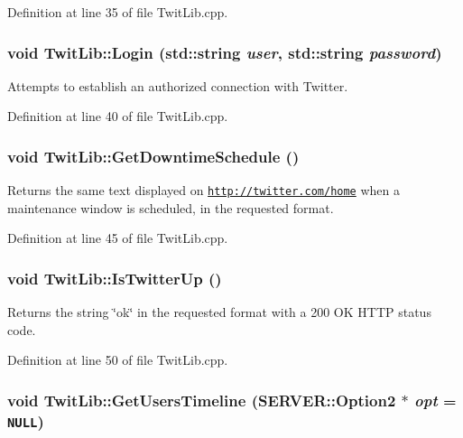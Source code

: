Definition at line 35 of file TwitLib.cpp.\hypertarget{classTwitLib_f0260115262ab0078071a4af3407b635}{
\subsubsection{\setlength{\rightskip}{0pt plus 5cm}void TwitLib::Login (std::string {\em user}, \/  std::string {\em password})}}
\label{classTwitLib_f0260115262ab0078071a4af3407b635}


Attempts to establish an authorized connection with Twitter. 

Definition at line 40 of file TwitLib.cpp.\hypertarget{classTwitLib_0c5eb8acd3bc570d2230c0a999ba2caf}{
\subsubsection{\setlength{\rightskip}{0pt plus 5cm}void TwitLib::GetDowntimeSchedule ()}}
\label{classTwitLib_0c5eb8acd3bc570d2230c0a999ba2caf}


Returns the same text displayed on \href{http://twitter.com/home}{\tt http://twitter.com/home} when a maintenance window is scheduled, in the requested format. 

Definition at line 45 of file TwitLib.cpp.\hypertarget{classTwitLib_3f90df9ede601963bb0ce8b1bcdb9886}{
\subsubsection{\setlength{\rightskip}{0pt plus 5cm}void TwitLib::IsTwitterUp ()}}
\label{classTwitLib_3f90df9ede601963bb0ce8b1bcdb9886}


Returns the string \char`\"{}ok\char`\"{} in the requested format with a 200 OK HTTP status code. 

Definition at line 50 of file TwitLib.cpp.\hypertarget{classTwitLib_fe45ea97705c30d9f635a3ddf04cb27b}{
\subsubsection{\setlength{\rightskip}{0pt plus 5cm}void TwitLib::GetUsersTimeline ({\bf SERVER::Option2} $\ast$ {\em opt} = {\tt NULL})}}
\label{classTwitLib_fe45ea97705c30d9f635a3ddf04cb27b}


